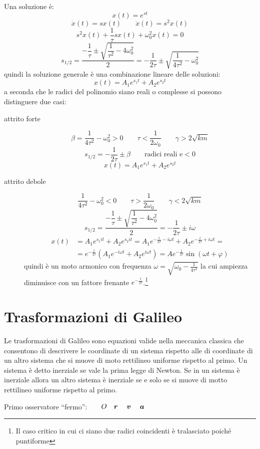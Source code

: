 Una soluzione è:
\[x(t)=e^{st}\]
\[\dot x(t)=sx(t)\qquad \ddot x(t)=s^2x(t)\]
\[s^2x(t)+\frac{1}{\tau}sx(t)+\omega_0^2x(t)=0\]
\[s_{1/2}=\dfrac{-\dfrac{1}{\tau}\pm\sqrt{\dfrac{1}{\tau^2}-4\omega_0^2}}{2}=-\frac{1}{2\tau}\pm\sqrt{\frac{1}{4\tau^2}-\omega_0^2}\]
quindi la soluzione generale è una combinazione lineare delle soluzioni:
\[
  x(t)=A_1e^{s_1t}+A_2e^{s_2t}
\]
a seconda che le radici del polinomio siano reali o complesse si possono distinguere due casi:
\begin{description}
  \item[attrito forte]
    \[\beta=\frac{1}{4\tau^2}-\omega_0^2>0\qquad\tau<\frac{1}{2\omega_0}\qquad\gamma>2\sqrt{km}\]
    \[s_{1/2}=-\frac{1}{2\tau}\pm\beta\qquad\text{radici reali e}<0\]
    \[x(t)=A_1e^{s_1t}+A_2e^{s_2t}\]
  \item[attrito debole]
    \[\frac{1}{4\tau^2}-\omega_0^2<0\qquad \tau>\frac{1}{2\omega_0}\qquad\gamma<2\sqrt{km}\]
    \[s_{1/2}=\dfrac{-\dfrac{1}{\tau}\pm\sqrt{\dfrac{1}{\tau^2}-4\omega_0^2}}{2}=-\frac{1}{2\tau}\pm i\omega\]
    \begin{align*}x(t) & =A_1e^{s_1it}+A_2e^{s_2it}=A_1e^{-\frac{t}{2\tau}-i\omega t}+A_2e^{-\frac{t}{2\tau}+i\omega t}=                    \\
                   & =e^{-\frac{t}{2\tau}}\left(A_1e^{-i\omega t}+A_2e^{i\omega t}\right)=A e^{-\frac{t}{2\tau}}\sin(\omega t +\varphi)\end{align*}
    quindi è un moto armonico con frequenza $\omega=\sqrt{\omega_0-\frac{1}{4\tau^2}}$ la cui ampiezza diminuisce con un fattore frenante $e^{-\frac{t}{2\tau}}$.\footnote{Il caso critico in cui ci siano due radici coincidenti è tralasciato poiché puntiforme}
\end{description}

\section{Trasformazioni di Galileo}
Le trasformazioni di Galileo sono equazioni valide nella meccanica classica che consentono di descrivere le coordinate di un sistema rispetto alle di coordinate di un altro sistema che si muove di moto rettilineo uniforme rispetto al primo. Un sistema è detto inerziale se vale la prima legge di Newton. Se in un sistema è inerziale allora un altro sistema è inerziale se e solo se si muove di motto rettilineo uniforme rispetto al primo.
\newline

Primo osservatore ``fermo'':$\qquad O\quad\boldsymbol{r}\quad\;\boldsymbol{v}\quad\;\boldsymbol{a}$

